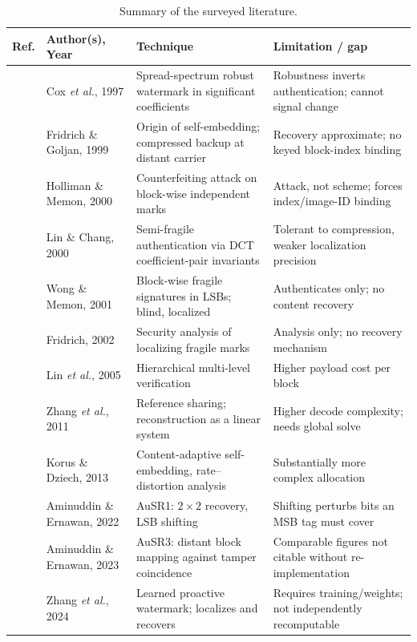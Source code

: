 \documentclass[12pt,a4paper]{article}
\begin{document}
\begin{table}[htbp]
\centering
\caption{Summary of the surveyed literature.}
\label{tab:lit}
\small
\begin{tabular}{@{}p{0.4in}p{1.25in}p{1.9in}p{1.75in}@{}}
\toprule
\textbf{Ref.} & \textbf{Author(s), Year} & \textbf{Technique} & \textbf{Limitation / gap} \\
\midrule
\cite{cox1997secure} & Cox \emph{et al.}, 1997 & Spread-spectrum robust watermark in significant coefficients & Robustness inverts authentication; cannot signal change \\
\cite{fridrich1999selfembedding} & Fridrich \& Goljan, 1999 & Origin of self-embedding; compressed backup at distant carrier & Recovery approximate; no keyed block-index binding \\
\cite{holliman2000counterfeiting} & Holliman \& Memon, 2000 & Counterfeiting attack on block-wise independent marks & Attack, not scheme; forces index/image-ID binding \\
\cite{linchang2000} & Lin \& Chang, 2000 & Semi-fragile authentication via DCT coefficient-pair invariants & Tolerant to compression, weaker localization precision \\
\cite{wong2001secret} & Wong \& Memon, 2001 & Block-wise fragile signatures in LSBs; blind, localized & Authenticates only; no content recovery \\
\cite{fridrich2002security} & Fridrich, 2002 & Security analysis of localizing fragile marks & Analysis only; no recovery mechanism \\
\cite{lin2005hierarchical} & Lin \emph{et al.}, 2005 & Hierarchical multi-level verification & Higher payload cost per block \\
\cite{zhang2011reference} & Zhang \emph{et al.}, 2011 & Reference sharing; reconstruction as a linear system & Higher decode complexity; needs global solve \\
\cite{korus2013efficient} & Korus \& Dziech, 2013 & Content-adaptive self-embedding, rate--distortion analysis & Substantially more complex allocation \\
\cite{ausr1} & Aminuddin \& Ernawan, 2022 & AuSR1: $2\times2$ recovery, LSB shifting & Shifting perturbs bits an MSB tag must cover \\
\cite{ausr3} & Aminuddin \& Ernawan, 2023 & AuSR3: distant block mapping against tamper coincidence & Comparable figures not citable without re-implementation \\
\cite{editguard} & Zhang \emph{et al.}, 2024 & Learned proactive watermark; localizes and recovers & Requires training/weights; not independently recomputable \\
\bottomrule
\end{tabular}
\end{table}
\end{document}
